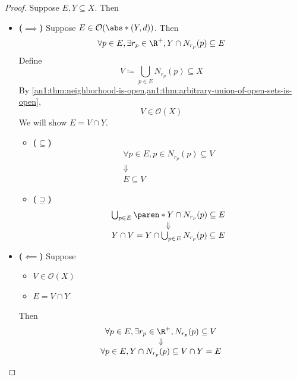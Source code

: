 \begin{proof}
  Suppose $E, Y \subseteq X$. Then
  \begin{itemize}
    \item \textbf{($\implies$)} Suppose $E \in \mathcal{O}(\abs*{(Y, d)})$. Then
          \[
            \forall p \in E, \exists r_{p} \in \R^{+}, Y \cap N_{r_{p}}(p) \subseteq E
          \]
          Define
          \[
            V \coloneqq \bigcup_{p \in E} N_{r_{p}}(p) \subseteq X
          \]
          By \cref{an1:thm:neighborhood-is-open,an1:thm:arbitrary-union-of-open-sets-is-open},
          \[
            V \in \mathcal{O}(X)
          \]
          We will show $E = V \cap Y$.
          \begin{itemize}
            \item \textbf{($\subseteq$)}
                  \[
                    \begin{array}{c}
                      \forall p \in E, p \in N_{r_{p}}(p) \subseteq V \\
                      \Downarrow                                      \\
                      E \subseteq V
                    \end{array}
                  \]
            \item \textbf{($\supseteq$)}
                  \[
                    \begin{array}{c}
                      \bigcup_{p \in E} \paren*{Y \cap N_{r_{p}}(p)} \subseteq E \\
                      \Downarrow                                                 \\
                      Y \cap V = Y \cap \bigcup_{p \in E} N_{r_{p}}(p) \subseteq E
                    \end{array}
                  \]
          \end{itemize}
    \item \textbf{($\impliedby$)} Suppose
          \begin{itemize}
            \item $V \in \mathcal{O}(X)$
            \item $E = V \cap Y$
          \end{itemize}
          Then
          \[
            \begin{array}{c}
              \forall p \in E, \exists r_{p} \in \R^{+}, N_{r_{p}}(p) \subseteq V \\
              \Downarrow                                                          \\
              \forall p \in E, Y \cap N_{r_{p}}(p) \subseteq V \cap Y = E
            \end{array}
          \]
  \end{itemize}
\end{proof}
